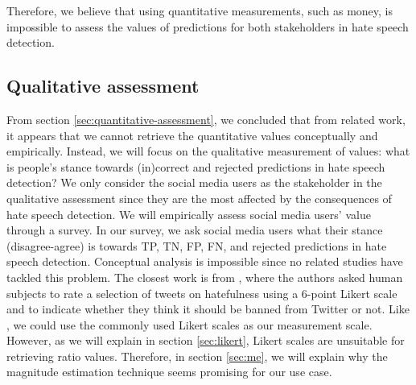 %
Therefore, we believe that using quantitative measurements, such as money, is impossible to assess the values of predictions for both stakeholders in hate speech detection.
%

\subsection{Qualitative assessment}
From section \ref{sec:quantitative-assessment}, we concluded that from related work, it appears that we cannot retrieve the quantitative values conceptually and empirically.
%
Instead, we will focus on the qualitative measurement of values: what is people's stance towards (in)correct and rejected predictions in hate speech detection?
%
We only consider the social media users as the stakeholder in the qualitative assessment since they are the most affected by the consequences of hate speech detection.
%
We will empirically assess social media users' value through a survey.
%
In our survey, we ask social media users what their stance (disagree-agree) is towards TP, TN, FP, FN, and rejected predictions in hate speech detection.
%
Conceptual analysis is impossible since no related studies have tackled this problem.
%
The closest work is from \citet{ross2017measuring}, where the authors asked human subjects to rate a selection of tweets on hatefulness using a 6-point Likert scale and to indicate whether they think it should be banned from Twitter or not.
%
Like \citet{ross2017measuring}, we could use the commonly used Likert scales as our measurement scale.
%
However, as we will explain in section \ref{sec:likert}, Likert scales are unsuitable for retrieving ratio values.
%
Therefore, in section \ref{sec:me}, we will explain why the magnitude estimation technique seems promising for our use case.

